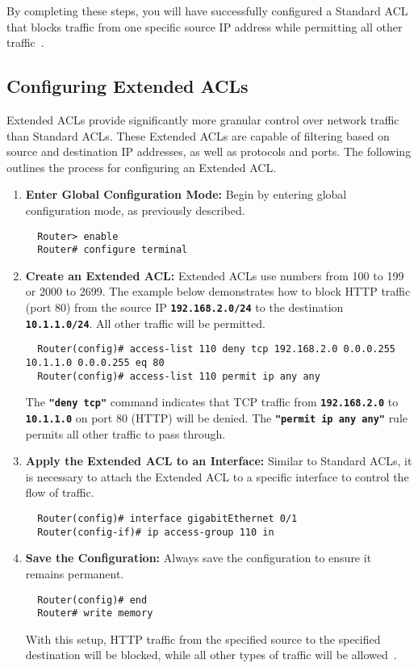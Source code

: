 \documentclass[11pt,a4paper]{article}
\begin{document}
        By completing these steps, you will have successfully configured a Standard ACL that blocks traffic from one specific source IP address while permitting all other traffic~\cite{Configuring-Standard-ACLs}. 

    \subsection*{Configuring Extended ACLs}
        Extended ACLs provide significantly more granular control over network traffic than Standard ACLs. These Extended ACLs are capable of filtering based on source and destination IP addresses, as well as protocols and ports. The following outlines the process for configuring an Extended ACL.
        \begin{enumerate}
           \item \textbf{Enter Global Configuration Mode:} Begin by entering global configuration mode, as previously described.
\begin{lstlisting}
  Router> enable
  Router# configure terminal    
\end{lstlisting}
            \item \textbf{Create an Extended ACL:} Extended ACLs use numbers from 100 to 199 or 2000 to 2699. The example below demonstrates how to block HTTP traffic (port 80) from the source IP \textbf{\lstinline{192.168.2.0/24}} to the destination \textbf{\lstinline{10.1.1.0/24}}. All other traffic will be permitted.

\begin{lstlisting}
  Router(config)# access-list 110 deny tcp 192.168.2.0 0.0.0.255 10.1.1.0 0.0.0.255 eq 80
  Router(config)# access-list 110 permit ip any any    
\end{lstlisting}

            The \textbf{\lstinline{"deny tcp"}} command indicates that TCP traffic from \textbf{\lstinline{192.168.2.0}} to \textbf{\lstinline{10.1.1.0}} on port 80 (HTTP) will be denied. The \textbf{\lstinline{"permit ip any any"}} rule permits all other traffic to pass through.

            \item \textbf{Apply the Extended ACL to an Interface:} Similar to Standard ACLs, it is necessary to attach the Extended ACL to a specific interface to control the flow of traffic.
\begin{lstlisting}
  Router(config)# interface gigabitEthernet 0/1
  Router(config-if)# ip access-group 110 in   
\end{lstlisting}
            \item \textbf{Save the Configuration:} Always save the configuration to ensure it remains permanent.
\begin{lstlisting}
  Router(config)# end
  Router# write memory 
\end{lstlisting}

            With this setup, HTTP traffic from the specified source to the specified destination will be blocked, while all other types of traffic will be allowed~\cite{Configuring-Extended-ACLs}.

        \end{enumerate}
\end{document}
